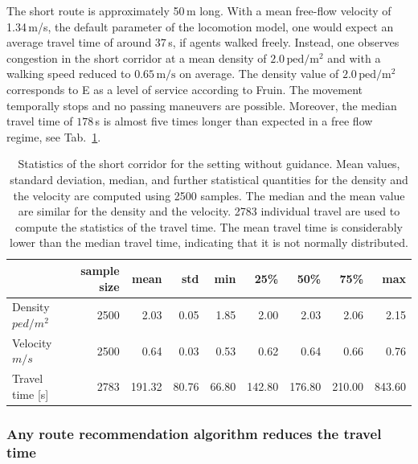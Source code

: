 The short route is approximately 50\,m long. With a mean free-flow velocity of 1.34\,m/s, the default parameter of the locomotion model, one would expect an average travel time of around 37\,s, if agents walked freely. Instead, one observes congestion in the short corridor 
at a mean density of $2.0\,\text{ped}/\text{m}^{2}$ and with a walking speed reduced to $0.65\,\text{m/s}$ on average. 
% 
The density value of $2.0\,\text{ped}/\text{m}^{2}$ corresponds to E as a level of service according to Fruin. The movement temporally stops and no passing maneuvers are possible. Moreover, the median travel time of $178\,$s is almost five times longer than expected in a free flow regime, see Tab.~\ref{tab:velocitiesDensities}. 
%



\begin{table}[hbt!]
\begin{footnotesize}
\centering
\begin{tabular}{lrrrrrrrr}
\toprule
 & sample size & mean & std & min & 25\% & 50\% & 75\% & max \\
\midrule
Density $ped/m^2$ & 2500 & 2.03 & 0.05 & 1.85 & 2.00 & 2.03 & 2.06 & 2.15 \\
Velocity $m/s$ & 2500 & 0.64 & 0.03 & 0.53 & 0.62 & 0.64 & 0.66 & 0.76 \\
Travel time [s] & 2783 & 191.32 & 80.76 & 66.80 & 142.80 & 176.80 & 210.00 & 843.60 \\
\bottomrule
\end{tabular}
\end{footnotesize}
\caption[Statistics of the short corridor for the setting without guidance]{Statistics of the short corridor for the setting without guidance. Mean values, standard deviation, median, and further statistical quantities for the density and the velocity are computed using 2500 samples.
The median and the mean value are similar for the density and the velocity. 2783 individual travel are used to compute the statistics of the travel time.
The mean travel time is considerably lower than the median travel time, indicating that it is not normally distributed. }
\label{tab:velocitiesDensities}
\end{table}



\subsubsection{Any route recommendation algorithm reduces the travel time}


